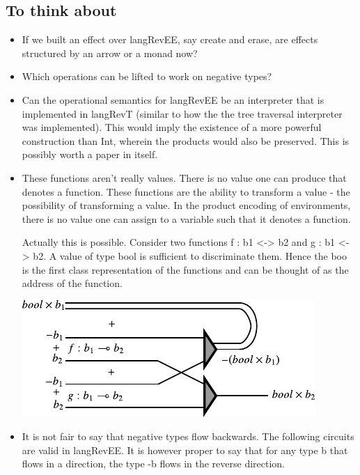 \documentclass[preprint]{sigplanconf}
\begin{document}
\subsection{To think about}

\begin{itemize}

\item If we built an effect over {{langRevEE}}, say {{create}} and
  {{erase}}, are effects structured by an arrow or a monad now?

\item Which operations can be lifted to work on negative types?

\item Can the operational semantics for {{langRevEE}} be an
  interpreter that is implemented in {{langRevT}} (similar to how the
  the tree traversal interpreter was implemented). This would imply
  the existence of a more powerful construction than Int, wherein the
  products would also be preserved. This is possibly worth a paper in
  itself.

\item These functions aren't really values. There is no value one can
  produce that denotes a function. These functions are the ability to
  transform a value - the possibility of transforming a value.  In the
  product encoding of environments, there is no value one can assign
  to a variable such that it denotes a function.


Actually this is possible. Consider two functions {{f : b1 <-> b2}}
and {{g : b1 <-> b2}}. A value of type {{bool}} is sufficient to
discriminate them. Hence the {{boo}} is the first class representation
of the functions and can be thought of as the address of the function. 

\begin{center}
  \includegraphics{diagrams/dispatch.pdf}
\end{center}


\item It is not fair to say that negative types flow backwards. The
  following circuits are valid in {{langRevEE}}. It is however proper
  to say that for any type {{b}} that flows in a direction, the type
  {{-b}} flows in the reverse direction. 


\end{itemize}
\end{document}
